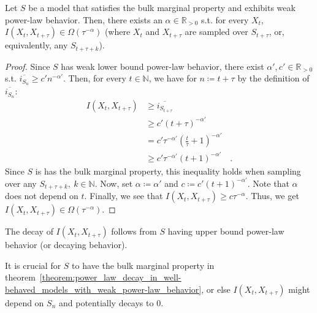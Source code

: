 \documentclass[../../main.tex]{subfiles}
\begin{document}
    \begin{theorem}
        \label{theorem:power_law_decay_in_well-behaved_models_with_weak_power-law_behavior}
        Let $S$ be a model that satisfies the bulk marginal property and exhibits weak power-law behavior. Then, there exists an $\alpha \in \mathbb{R}_{>0}$ s.t. for every $X_t$, $I(X_{t}, X_{t + \tau}) \in \Omega(\tau^{-\alpha})$ (where $X_t$ and $X_{t + \tau}$ are sampled over $S_{t + \tau}$, or, equivalently, any $S_{t + \tau + k}$).
    \end{theorem}
    \vspace{-2.5em}
    \begin{proof}
        Since $S$ has weak lower bound power-law behavior, there exist $\alpha', c' \in \mathbb{R}_{>0}$ s.t. $\overline{i_{S_n}} \geq c' n^{-\alpha'}$. Then, for every $t \in \mathbb{N}$, we have for $n \coloneqq t + \tau$ by the definition of $\overline{i_{S_n}}$:
        \begin{align*}
            I(X_{t}, X_{t + \tau}) &\geq \overline{i_{S_{t + \tau}}} \\
            &\geq c' (t + \tau)^{-\alpha'} \\
            &= c' \tau^{-\alpha'} (\frac{t}{\tau} + 1)^{-\alpha'} \\
            &\geq c' \tau^{-\alpha'} (t + 1)^{-\alpha'} \quad .
        \end{align*}
        Since $S$ is has the bulk marginal property, this inequality holds when sampling over any $S_{t + \tau + k}, \ k \in \mathbb{N}$. Now, set $\alpha \coloneqq \alpha'$ and $c \coloneqq c' (t + 1)^{-\alpha'}$. Note that $\alpha$ does not depend on $t$. Finally, we see that $I(X_{t}, X_{t + \tau}) \geq c \tau^{-\alpha}$. Thus, we get $I(X_{t}, X_{t + \tau}) \in \Omega(\tau^{-\alpha})$.
    \end{proof}

    \begin{remark}
        The decay of $I(X_{t}, X_{t + \tau})$ follows from $S$ having upper bound power-law behavior (or decaying behavior).
    \end{remark}

    \begin{remark}
        It is crucial for $S$ to have the bulk marginal property in theorem~\ref{theorem:power_law_decay_in_well-behaved_models_with_weak_power-law_behavior}, or else $I(X_{t}, X_{t + \tau})$ might depend on $S_n$ and potentially decays to $0$.
    \end{remark}
\end{document}
